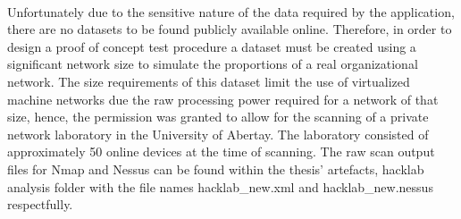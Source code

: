 \paragraph{}Unfortunately due to the sensitive nature of the data required by the application, there are no datasets to be found publicly available online. Therefore, in order to design a proof of concept test procedure a dataset must be created using a significant network size to simulate the proportions of a real organizational network. The size requirements of this dataset limit the use of virtualized machine networks due the raw processing power required for a network of that size, hence, the permission was granted to allow for the scanning of a private network laboratory in the University of Abertay. The laboratory consisted of approximately 50 online devices at the time of scanning. The raw scan output files for Nmap and Nessus can be found within the thesis' artefacts, hacklab analysis folder with the file names hacklab\_new.xml and hacklab\_new.nessus respectfully.

